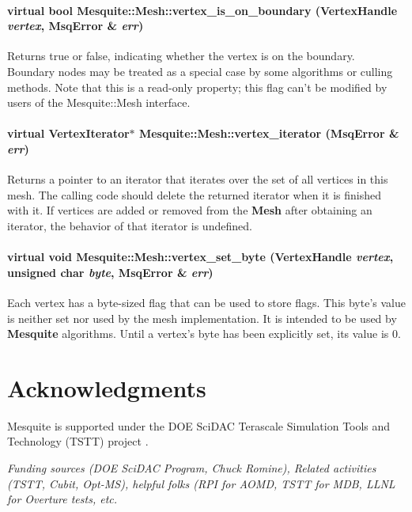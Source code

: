 \documentclass[letter]{report}
\begin{document}
\subsubsection{\setlength{\rightskip}{0pt plus 5cm}virtual bool Mesquite::Mesh::vertex\_\-is\_\-on\_\-boundary (Vertex\-Handle {\em vertex}, {\bf Msq\-Error} \& {\em err})\hspace{0.3cm}{\tt  [pure virtual]}}\label{classMesquite_1_1Mesh_a8}


Returns true or false, indicating whether the vertex is on the boundary. Boundary nodes may be treated as a special case by some algorithms or culling methods. Note that this is a read-only property; this flag can't be modified by users of the Mesquite::Mesh interface. 

\subsubsection{\setlength{\rightskip}{0pt plus 5cm}virtual Vertex\-Iterator$\ast$ Mesquite::Mesh::vertex\_\-iterator ({\bf Msq\-Error} \& {\em err})\hspace{0.3cm}{\tt  [pure virtual]}}\label{classMesquite_1_1Mesh_a5}


Returns a pointer to an iterator that iterates over the set of all vertices in this mesh. The calling code should delete the returned iterator when it is finished with it. If vertices are added or removed from the {\bf Mesh} after obtaining an iterator, the behavior of that iterator is undefined. 

\subsubsection{\setlength{\rightskip}{0pt plus 5cm}virtual void Mesquite::Mesh::vertex\_\-set\_\-byte (Vertex\-Handle {\em vertex}, unsigned char {\em byte}, {\bf Msq\-Error} \& {\em err})\hspace{0.3cm}{\tt  [pure virtual]}}\label{classMesquite_1_1Mesh_a11}


Each vertex has a byte-sized flag that can be used to store flags. This byte's value is neither set nor used by the mesh implementation. It is intended to be used by {\bf Mesquite} algorithms. Until a vertex's byte has been explicitly set, its value is 0. 


\chapter{Acknowledgments}

Mesquite is supported under the DOE SciDAC Terascale Simulation 
Tools and Technology (TSTT) project \cite{tstt}.  

{\it Funding sources (DOE SciDAC Program, Chuck Romine), Related activities
(TSTT, Cubit, Opt-MS), helpful folks (RPI for AOMD, TSTT for MDB, LLNL
for Overture tests, etc.}




\end{document}
